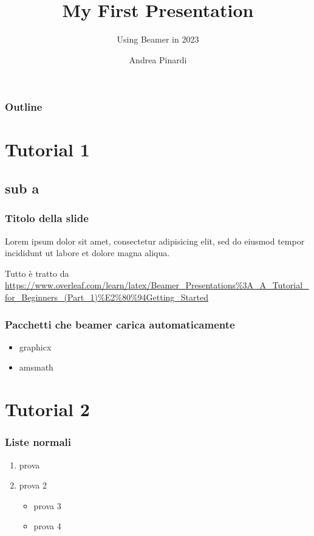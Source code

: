 \documentclass{beamer}[10]
\begin{document}
	\title{My First Presentation}
	\subtitle{Using Beamer in 2023}
	\author{Andrea Pinardi}
	
	
	
	\begin{frame}
		\titlepage
	\end{frame}
	
	\begin{frame}
		\frametitle{Outline}
		\tableofcontents
	\end{frame}
	
	\section{Tutorial 1}
	\subsection{sub a}
	\begin{frame}
		\frametitle{Titolo della slide}
		Lorem ipsum dolor sit amet, consectetur adipisicing elit, sed do eiusmod tempor incididunt ut labore et dolore magna aliqua.
		
		Tutto è tratto da \url{https://www.overleaf.com/learn/latex/Beamer_Presentations\%3A_A_Tutorial_for_Beginners_(Part_1)\%E2\%80\%94Getting_Started}
	\end{frame}
	
	\begin{frame}
		\label{label_della_slide}		%
		\frametitle{Pacchetti che beamer carica automaticamente}
		\begin{itemize}
			\item graphicx
			\item amsmath
		\end{itemize}
	\end{frame}
	
	\section{Tutorial 2}
	\begin{frame}
		\frametitle{Liste normali}
		\begin{enumerate}
			\item prova
			\item prova 2
			\begin{itemize}
				\item prova 3
				\item prova 4
			\end{itemize}
		\end{enumerate}
	\end{frame}
	
\end{document}
